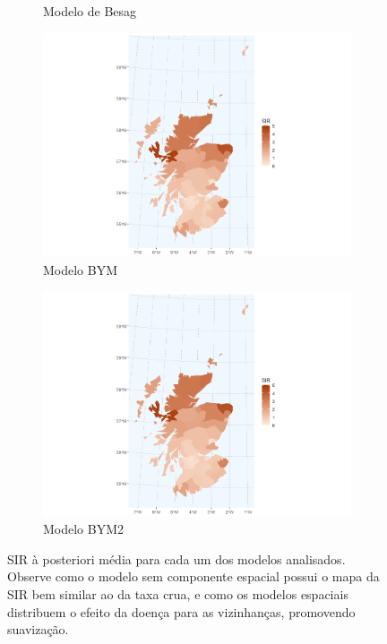 \begin{figure}[ht]
\begin{subfigure}[b]{0.5\linewidth}
    \caption{Modelo de Besag} 
    \label{fig7:b} 
    \vspace{4ex}
  \end{subfigure} 
  \begin{subfigure}[b]{0.5\linewidth}
    \centering
    \includegraphics[width=0.9\linewidth]{images/SIR_posteriori_BYM.png} 
    \caption{Modelo BYM} 
    \label{fig7:c} 
  \end{subfigure}%
  \begin{subfigure}[b]{0.5\linewidth}
    \centering
    \includegraphics[width=0.9\linewidth]{images/SIR_posteriori_BYM2.png} 
    \caption{Modelo BYM2} 
    \label{fig7:d} 
  \end{subfigure} 
  \caption{SIR à posteriori média para cada um dos modelos analisados. Observe como o modelo sem componente espacial possui o mapa da SIR bem similar ao da taxa crua, e como os modelos espaciais distribuem o efeito da doença para as vizinhanças, promovendo suavização.}
  \label{fig7} 
\end{figure}


